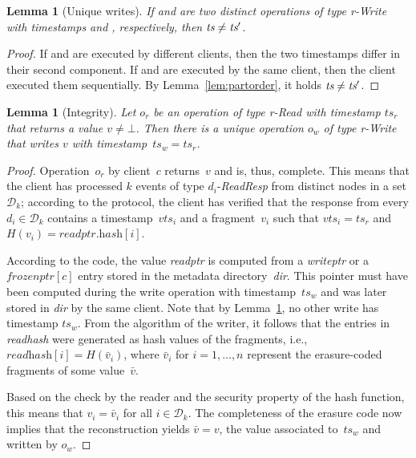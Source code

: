 \documentclass[oribibl]{llncs}
\newtheorem{lemma}[theorem]{Lemma}
\theoremstyle{definition-boldhead}
\newcommand{\var}[1]{\textit{#1}}
\newcommand{\op}[1]{\textsl{#1}}
\newcommand{\replicaset}{\ensuremath{\mathcal{D}}\xspace}
\newcommand{\dir}{\var{dir}\xspace}
\newcommand{\nodes}{nodes\xspace}
\begin{document}
\begin{lemma}[Unique writes]\label{lem:unqwrites}
  If \opr and \popr are two distinct operations of type
  \var{r}-\op{Write} with timestamps \tsopr and \tspopr, respectively,
  then $\tsopr \neq \tspopr$.
\end{lemma}

\begin{proof}
  If \opr and \popr are executed by different clients, then the two
  timestamps differ in their second component. If \opr and \popr are
  executed by the same client, then the client executed them
  sequentially. By Lemma~\ref{lem:partorder}, it holds $\tsopr \neq
  \tspopr$.
\end{proof}





\begin{lemma}[Integrity]\label{lem:integr}
  Let $o_r$ be an operation of type \var{r}-\op{Read} with timestamp
  $\var{ts}_r$ that returns a value $v \neq \bot$.  Then there is a
  unique operation $o_w$ of type \var{r}-\op{Write} that writes $v$
  with timestamp~$\var{ts}_w = \var{ts}_r$.
\end{lemma}

\begin{proof}
  Operation~$o_r$ by client~$c$ returns~$v$ and is, thus, complete.
  This means that the client has processed $k$ events of type
  $d_i$-\op{ReadResp} from distinct \nodes in a set $\replicaset_k$;
  according to the protocol, the client has verified that the response
  from every $d_i \in \replicaset_k$ contains a
  timestamp~$\var{vts}_i$ and a fragment~$v_i$ such that $\var{vts}_i
  = \var{ts}_r$ and $H(v_i) = \var{readptr.hash}[i]$.



  According to the code, the value \var{readptr} is computed from a
  \var{writeptr} or a $\var{frozenptr}[c]$ entry stored in the metadata
  directory~\dir.  This pointer must have been computed during the
  write operation with timestamp~$\var{ts}_w$ and was later stored in
  \dir by the same client.  Note that by Lemma~\ref{lem:unqwrites}, no
  other write has timestamp $\var{ts}_w$.  From the algorithm of the
  writer, it follows that the entries in \var{readhash} were generated
  as hash values of the fragments, i.e., $\var{readhash}[i] =
  H(\bar{v}_i)$, where $\bar{v}_i$ for $i=1,\dots,n$ represent the
  erasure-coded fragments of some value~$\bar{v}$.

  Based on the check by the reader and the security property of the
  hash function, this means that $v_i = \bar{v}_i$ for all $i \in
  \replicaset_k$. The completeness of the erasure code now implies
  that the reconstruction yields $\bar{v} = v$, the value associated
  to~$\var{ts}_w$ and written by $o_w$.
\end{proof}
\end{document}
